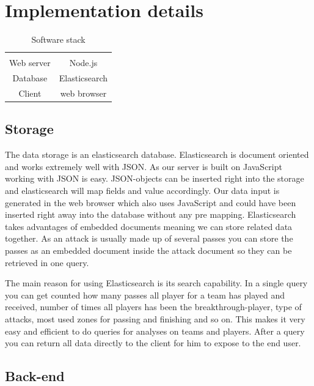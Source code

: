 \section{Implementation details}

\begin{table}[ht]
\caption{Software stack}
\begin{center}
\begin{tabular}{c|c}
    \hline
    \multicolumn{2}{c}{}\\
    Web server& Node.js\\
    Database& Elasticsearch\\
    Client & web  browser \\
\hline
\end{tabular}
\end{center}
\label{tab:multicol}
\end{table}


\subsection{Storage}

The data storage is an elasticsearch database. Elasticsearch is document oriented and works extremely well with JSON. As our server is built on JavaScript working with JSON is easy. JSON-objects can be inserted right into the storage and elasticsearch will map fields and value accordingly.  Our data input is generated in the web browser which also uses JavaScript and could have been inserted right away into the database without any pre mapping.
Elasticsearch takes advantages of embedded documents meaning we can store related data together. As an attack is usually made up of several passes you can store the passes as an embedded document inside the attack document so they can be retrieved in one query. 

The main reason for using Elasticsearch is its search capability. In a single query you can get counted how many passes all player for a team has played and received, number of times all players has been the breakthrough-player, type of attacks, most used zones for passing and finishing and so on. This makes it very easy and efficient to do queries for analyses on teams and players. After a query you can return all data directly to the client for him to expose to the end user.

\subsection{Back-end}

